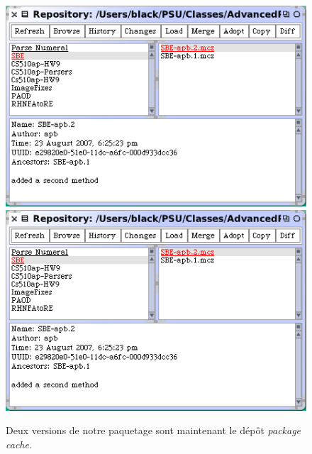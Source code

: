 \documentclass[a4paper,10pt,twoside]{book}
\begin{document}
\begin{figure}[tbp]
	\begin{center}
	\ifluluelse
		{\includegraphics[width=\textwidth]{package-cache-browser}}
		{\includegraphics[scale=0.7]{package-cache-browser}}
	\end{center}
	\caption{Deux versions de notre paquetage sont maintenant le d\'ep\^ot \emph{package cache}.}
	\label{fig:package-cache-browser}
\end{figure}
\end{document}
